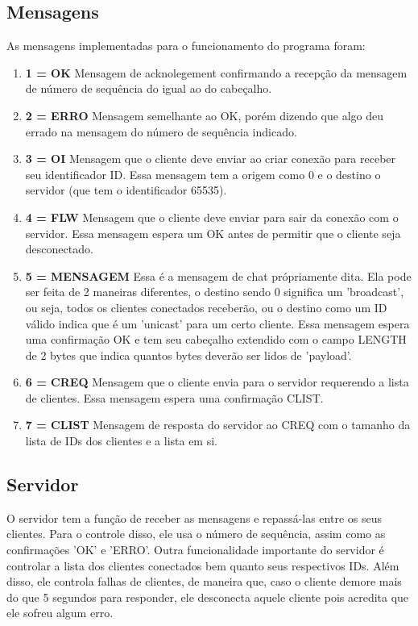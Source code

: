 \documentclass[10pt]{article}
\begin{document}
	\subsection{Mensagens}
	As mensagens implementadas para o funcionamento do programa foram:
	\begin{enumerate}
		\item[]\textbf{1 = OK} Mensagem de acknolegement confirmando a recepção da mensagem de número de sequência do igual ao do cabeçalho.
		\item[]\textbf{2 = ERRO} Mensagem semelhante ao OK, porém dizendo que algo deu errado na mensagem do número de sequência indicado.
		\item[]\textbf{3 = OI} Mensagem que o cliente deve enviar ao criar conexão para receber seu identificador ID. Essa mensagem tem a origem como 0 e o destino o servidor (que tem o identificador 65535).
		\item[]\textbf{4 = FLW} Mensagem que o cliente deve enviar para sair da conexão com o servidor. Essa mensagem espera um OK antes de permitir que o cliente seja desconectado.
		\item[]\textbf{5 = MENSAGEM} Essa é a mensagem de chat própriamente dita. Ela pode ser feita de 2 maneiras diferentes, o destino sendo 0 significa um 'broadcast', ou seja, todos os clientes conectados receberão, ou o destino como um ID válido indica que é um 'unicast' para um certo cliente. Essa mensagem espera uma confirmação OK e tem seu cabeçalho extendido com o campo LENGTH de 2 bytes que indica quantos bytes deverão ser lidos de 'payload'.
		\item[]\textbf{6 = CREQ} Mensagem que o cliente envia para o servidor requerendo a lista de clientes. Essa mensagem espera uma confirmação CLIST.
		\item[]\textbf{7 = CLIST} Mensagem de resposta do servidor ao CREQ com o tamanho da lista de IDs dos clientes e a lista em si.
	\end{enumerate}	 
	\subsection{Servidor}
	O servidor tem a função de receber as mensagens e repassá-las entre os seus clientes. Para o controle disso, ele usa o número de sequência, assim como as confirmações 'OK' e 'ERRO'. Outra funcionalidade importante do servidor é controlar a lista dos clientes conectados bem quanto seus respectivos IDs. Além disso, ele controla falhas de clientes, de maneira que, caso o cliente demore mais do que 5 segundos para responder, ele desconecta aquele cliente pois acredita que ele sofreu algum erro.
\end{document}
